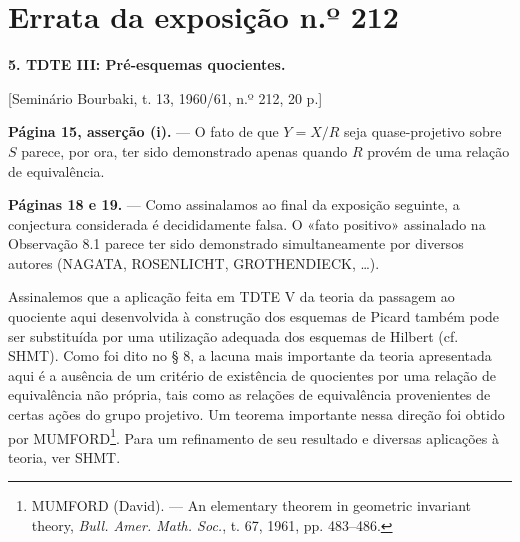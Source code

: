 \clearpage
\chapter*{Errata da exposição n.º 212}
\setcounter{footnote}{2}

\noindent\textbf{5. TDTE III: Pré-esquemas quocientes.}

\begin{center}
[Seminário Bourbaki, t. 13, 1960/61, n.º 212, 20 p.]
\end{center}

\noindent\textbf{Página 15, asserção (i).} --- O fato de que $Y=X/R$ seja
quase-projetivo sobre $S$ parece, por ora, ter sido demonstrado apenas quando
$R$ provém de uma relação de equivalência.

\noindent\textbf{Páginas 18 e 19.} --- Como assinalamos ao final da exposição
seguinte, a conjectura considerada é decididamente falsa. O «fato positivo»
assinalado na Observação 8.1 parece ter sido demonstrado simultaneamente por
diversos autores (NAGATA, ROSENLICHT, GROTHENDIECK, \ldots).

Assinalemos que a aplicação feita em TDTE V da teoria da passagem ao quociente
aqui desenvolvida à construção dos esquemas de Picard também pode ser
substituída por uma utilização adequada dos esquemas de Hilbert (cf. SHMT).
Como foi dito no § 8, a lacuna mais importante da teoria apresentada
aqui é a ausência de um critério de existência de quocientes por uma relação de
equivalência não própria, tais como as relações de equivalência provenientes de
certas ações do grupo projetivo. Um teorema importante nessa direção foi obtido
por MUMFORD\footnote{MUMFORD (David). --- An elementary theorem in geometric
invariant theory, \emph{Bull. Amer. Math. Soc.}, t. 67, 1961, pp. 483--486.}.
Para um refinamento de seu resultado e diversas aplicações à teoria, ver SHMT.

\par

